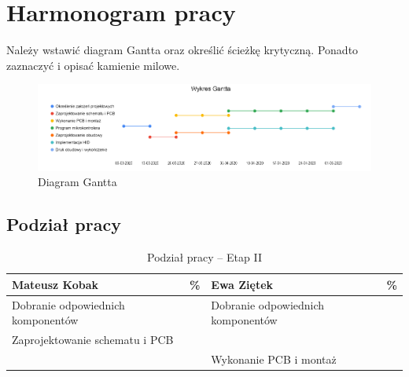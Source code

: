 \documentclass[10pt, a4paper]{article}
\begin{document}


\section{Harmonogram pracy}

Należy wstawić diagram Gantta oraz określić ścieżkę 
krytyczną. Ponadto zaznaczyć i opisać kamienie milowe.

\begin{figure}[H]
	\centering
	\includegraphics[width=1\textwidth]{figures/WykresGannta.png}
	\caption{Diagram Gantta}
	\label{fig:DiagramGantta}
\end{figure}

\subsection{Podział pracy}



\begin{table}[H]
	\centering
	\begin{tabular}{|L{7cm}|L{0.8cm}||L{7cm}|L{0.8cm}|}
		\hline
		\hline
		\textbf{Mateusz Kobak} & 
		\% & 
		\textbf{Ewa Ziętek} & \%\\
		\hline
		\hline
			Dobranie odpowiednich komponentów	& &	
	 Dobranie odpowiednich komponentów &\\
		\hline
		Zaprojektowanie schematu i PCB & &
 &\\
		\hline
			 & &
		Wykonanie PCB i montaż & \\
		\hline
	\end{tabular}
	\caption{Podział pracy -- Etap II}
	\label{tab:PodzialPracyEtap2}
\end{table}
\end{document}
